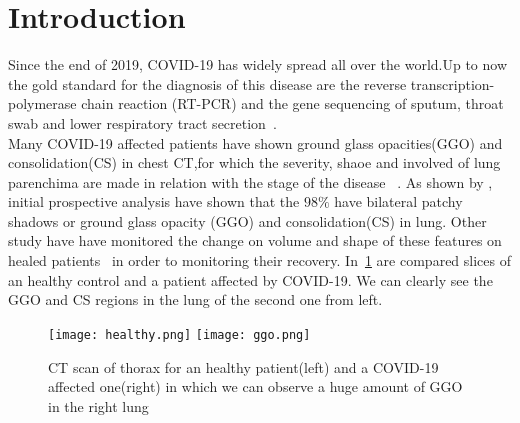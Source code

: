 \documentclass{standalone}
\begin{document}
\chapter*{Introduction}


Since the end of 2019, COVID-19 has widely spread all over the world.Up to now the gold standard for the diagnosis of this disease are the reverse transcription-polymerase chain reaction (RT-PCR) and the gene sequencing of sputum, throat swab and lower respiratory tract secretion~\cite{ART:Zhao}.\\ Many COVID-19 affected patients have shown ground glass opacities(GGO) and consolidation(CS) in chest CT,for which the severity, shaoe and involved of lung parenchima are made in relation with the stage of the disease ~\cite{ART:Bernheim}.  As shown by \cite{ART:Huang}, initial prospective analysis have shown that the $98\%$ have bilateral patchy shadows or ground glass opacity (GGO) and consolidation(CS) in lung. Other study have have monitored the change on volume and shape of these features on healed patients~\cite{ART:Ai} in order to monitoring their recovery. In \figurename\,\ref{fig:HealthVSCovid} are compared slices of an healthy control and a patient affected by COVID-19. We can clearly see the GGO and CS regions in the lung of the second one from left.\\
	
\begin{figure}[h!]
	\centering
	\texttt{[image: healthy.png]}
	\quad
	\texttt{[image: ggo.png]}
	\label{fig:HealthVSCovid}\caption{CT scan of thorax for an healthy patient(left) and a COVID-19 affected one(right) in which we can observe a huge amount of GGO in the right lung}
\end{figure} 
\end{document}
